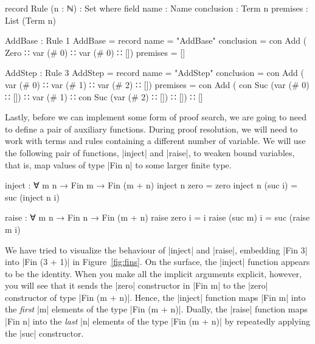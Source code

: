 \documentclass[preprint]{sigplanconf}
\begin{document}
\begin{code}
  record Rule (n : ℕ) : Set where
    field
      name        : Name
      conclusion  : Term n
      premises    : List (Term n)
\end{code}




\begin{code}
AddBase : Rule 1
AddBase = record {
  name        = "AddBase"
  conclusion  = con Add  (  Zero
                         ∷  var (# 0)
                         ∷  var (# 0)
                         ∷ [])
  premises    = []
  }

AddStep : Rule 3
AddStep = record {
  name        = "AddStep"
  conclusion  =  con Add  (  var (# 0)
                          ∷  var (# 1)
                          ∷  var (# 2)
                          ∷ [])
  premises    =  con Add  (  con Suc (var (# 0) ∷ [])
                          ∷  var (# 1)
                          ∷  con Suc (var (# 2) ∷ [])
                          ∷ [])
                 ∷ []
  }
\end{code}

Lastly, before we can implement some form of proof search, we are
going to need to define a pair of auxiliary functions. During proof
resolution, we will need to work with terms and rules containing a
different number of variable. We will use the following pair of
functions, |inject| and |raise|, to weaken bound variables, that is,
map values of type |Fin n| to some larger finite type.
\begin{code}
  inject : ∀ {m} n → Fin m → Fin (m + n)
  inject n  zero    = zero
  inject n (suc i)  = suc (inject n i)

  raise : ∀ m {n} → Fin n → Fin (m + n)
  raise  zero   i  = i
  raise (suc m) i  = suc (raise m i)
\end{code}
We have tried to visualize the behaviour of |inject| and |raise|,
embedding |Fin 3| into |Fin (3 + 1)| in Figure~\ref{fig:fins}. On the
surface, the |inject| function appears to be the identity. When you
make all the implicit arguments explicit, however, you will see that
it sends the |zero| constructor in |Fin m| to the |zero| constructor
of type |Fin (m + n)|. Hence, the |inject| function maps |Fin m| into the
\emph{first} |m| elements of the type |Fin (m + n)|. Dually, the
|raise| function maps |Fin n| into the \emph{last} |n| elements of the
type |Fin (m + n)| by repeatedly applying the |suc| constructor.
\end{document}
